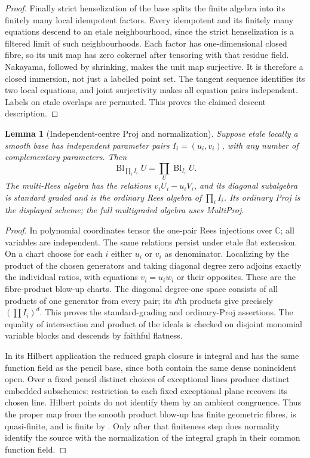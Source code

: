 \documentclass[11pt,reqno]{amsart}
\numberwithin{equation}{section}
\newtheorem{lemma}[theorem]{Lemma}
\theoremstyle{definition}\newtheorem{definition}[theorem]{Definition}
\theoremstyle{remark}\newtheorem{remark}[theorem]{Remark}
\newcommand{\C}{\mathbb C}\newcommand{\Q}{\mathbb Q}
\begin{document}
\begin{proof}
Finally strict henselization of the base splits the finite algebra
into its finitely many local idempotent factors. Every idempotent
and its finitely many equations descend to an etale neighbourhood,
since the strict henselization is a filtered limit of such
neighbourhoods. Each factor has one-dimensional closed fibre, so its
unit map has zero cokernel after tensoring with that residue field.
Nakayama, followed by shrinking, makes the unit map surjective.
It is therefore a closed immersion, not just a labelled point set.
The tangent sequence identifies its two local equations, and joint
surjectivity makes all equation pairs independent. Labels on etale
overlaps are permuted. This proves the claimed descent description.
\end{proof}

\begin{lemma}[Independent-centre Proj and normalization]
\label{lem:Proj-details-v162}
Suppose etale locally a smooth base has independent parameter pairs
$I_i=(u_i,v_i)$, with any number of complementary parameters. Then
\[
 \operatorname{Bl}_{\prod_i I_i}U
     =\prod_U\operatorname{Bl}_{I_i}U.
\]
The multi-Rees algebra has the relations
$v_iU_i-u_iV_i$, and its diagonal subalgebra is standard graded and
is the ordinary Rees algebra of $\prod_i I_i$. Its ordinary Proj
is the displayed scheme; the full multigraded algebra uses MultiProj.
\end{lemma}
\begin{proof}
In polynomial coordinates tensor the one-pair Rees injections over
$\C$; all variables are independent. The same relations persist
under etale flat extension. On a chart choose for each $i$ either
$u_i$ or $v_i$ as denominator. Localizing by the product of the
chosen generators and taking diagonal degree zero adjoins exactly
the individual ratios, with equations $v_i=u_iw_i$ or their opposites.
These are the fibre-product blow-up charts. The diagonal degree-one
space consists of all products of one generator from every pair;
its $d$th products give precisely $(\prod I_i)^d$. This proves the
standard-grading and ordinary-Proj assertions. The equality of
intersection and product of the ideals is checked on disjoint
monomial variable blocks and descends by faithful flatness.

In its Hilbert application the reduced graph closure is integral
and has the same function field as the pencil base, since both
contain the same dense nonincident open. Over a fixed pencil distinct
choices of exceptional lines produce distinct embedded subschemes:
restriction to each fixed exceptional plane recovers its chosen
line. Hilbert points do not identify them by an ambient congruence.
Thus the proper map from the smooth product blow-up has finite
geometric fibres, is quasi-finite, and is finite by
\cite[Tag~02LS]{StacksProject160}. Only after that finiteness step
does normality identify the source with the normalization of the
integral graph in their common function field.
\end{proof}
\end{document}
